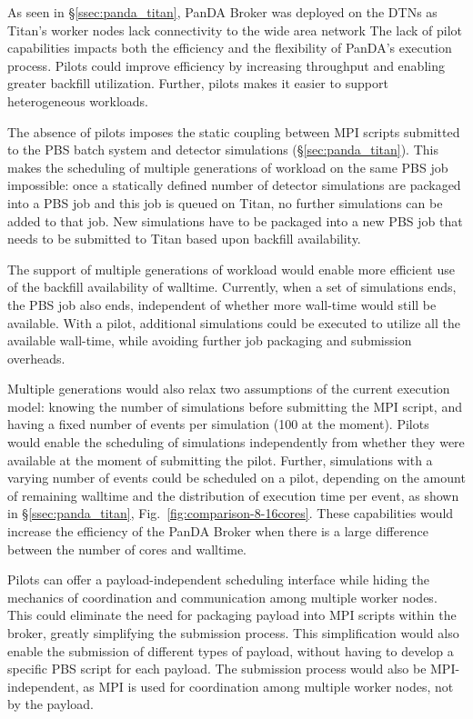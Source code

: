 As seen in \S\ref{ssec:panda_titan}, PanDA Broker was  deployed on the DTNs
as Titan's worker nodes lack connectivity to the wide area network The lack
of pilot capabilities impacts both the efficiency and the flexibility of
PanDA's execution process. Pilots could improve efficiency by increasing
throughput and enabling greater backfill utilization. Further, pilots makes
it easier to support heterogeneous workloads.

The absence of pilots imposes the static coupling between MPI scripts
submitted to the PBS batch system and detector simulations
(\S\ref{sec:panda_titan}). This makes the scheduling of multiple generations
of workload on the same PBS job impossible: once a statically defined number
of detector simulations are packaged into a PBS job and this job is queued on
Titan, no further simulations can be added to that job. New simulations have
to be packaged into a new PBS job that needs to be submitted to Titan based
upon backfill availability.

The support of  multiple generations of workload would enable more efficient
use of the backfill availability of walltime. Currently, when a set of
simulations ends, the PBS job also ends, independent of whether more
wall-time would still be available. With a pilot, additional simulations
could be executed  to utilize all the available wall-time, while avoiding
further job packaging and submission overheads.

Multiple generations would also relax two assumptions of the current
execution model: knowing the number of simulations before submitting the MPI
script, and having a fixed number of events per simulation (100 at the
moment). Pilots would enable the scheduling of simulations independently from
whether they were available at the moment of submitting the pilot. Further,
simulations with a varying number of events could be scheduled on a pilot,
depending on the amount of remaining walltime and the distribution of
execution time per event, as shown in \S\ref{ssec:panda_titan},
Fig.~\ref{fig:comparison-8-16cores}. These capabilities would increase the
efficiency of the PanDA Broker when there is a large difference between the
number of cores and walltime.

Pilots can offer a payload-independent scheduling interface while hiding the
mechanics of coordination and communication among multiple worker nodes. This
could eliminate the need for packaging payload into MPI scripts within the
broker, greatly simplifying the submission process. This simplification would
also enable the submission of different types of payload, without having to
develop a specific PBS script for each payload. The submission process would
also be MPI-independent, as MPI is used for coordination among multiple
worker nodes, not by the payload.

